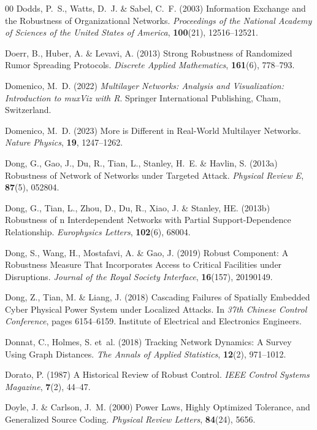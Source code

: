 \documentclass{comnet-mod}
\begin{document}
\begin{thebibliography}{00}
Dodds, P.~S., Watts, D.~J. {\&} Sabel, C.~F. (2003)  {Information Exchange and
  the Robustness of Organizational Networks}. {\em {Proceedings of the National
  Academy of Sciences of the United States of America}}, \textbf{100}(21),
  12516--12521.

Doerr, B., Huber, A. {\&} Levavi, A. (2013)  {Strong Robustness of Randomized
  Rumor Spreading Protocols}. {\em {Discrete Applied Mathematics}},
  \textbf{161}(6), 778--793.

Domenico, M.~D. (2022) {\em {Multilayer Networks: Analysis and Visualization:
  Introduction to muxViz with R}}.
Springer International Publishing, Cham, Switzerland.

Domenico, M.~D. (2023)  {More is Different in Real-World Multilayer Networks}.
  {\em {Nature Physics}}, \textbf{19}, 1247--1262.

Dong, G., Gao, J., Du, R., Tian, L., Stanley, H.~E. {\&} Havlin, S. (2013a)
  {Robustness of Network of Networks under Targeted Attack}. {\em {Physical
  Review E}}, \textbf{87}(5), 052804.

Dong, G., Tian, L., Zhou, D., Du, R., Xiao, J. {\&} Stanley, {\relax HE}.
  (2013b)  {Robustness of {{n}} Interdependent Networks with Partial
  Support-Dependence Relationship}. {\em {Europhysics Letters}},
  \textbf{102}(6), 68004.

Dong, S., Wang, H., Mostafavi, A. {\&} Gao, J. (2019)  {Robust Component: A
  Robustness Measure That Incorporates Access to Critical Facilities under
  Disruptions}. {\em {Journal of the Royal Society Interface}},
  \textbf{16}(157), 20190149.

Dong, Z., Tian, M. {\&} Liang, J. (2018)  {Cascading Failures of Spatially
  Embedded Cyber Physical Power System under Localized Attacks}. In {\em {37th
  Chinese Control Conference}}, pages 6154--6159. {Institute of Electrical and
  Electronics Engineers}.

Donnat, C., Holmes, S.  et~al. (2018)  {Tracking Network Dynamics: {{A}} Survey
  Using Graph Distances}. {\em {The Annals of Applied Statistics}},
  \textbf{12}(2), 971--1012.

Dorato, P. (1987)  {A Historical Review of Robust Control}. {\em {IEEE Control
  Systems Magazine}}, \textbf{7}(2), 44--47.

Doyle, J. {\&} Carlson, J.~M. (2000)  {Power Laws, Highly Optimized Tolerance,
  and Generalized Source Coding}. {\em {Physical Review Letters}},
  \textbf{84}(24), 5656.


\end{thebibliography}
\end{document}
